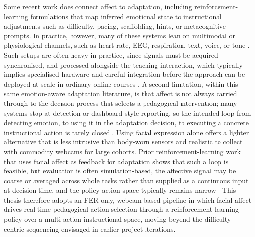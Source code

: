 Some recent work does connect affect to adaptation, including reinforcement-learning formulations that map inferred emotional state to instructional adjustments such as difficulty, pacing, scaffolding, hints, or metacognitive prompts. In practice, however, many of these systems lean on multimodal or physiological channels, such as heart rate, EEG, respiration, text, voice, or tone \cite{gong_design_2025,govea_implementation_2024}. Such setups are often heavy in practice, since signals must be acquired, synchronised, and processed alongside the teaching interaction, which typically implies specialised hardware and careful integration before the approach can be deployed at scale in ordinary online courses \cite{gutierrez_development_2025,kong_real-time_2025,nandimandalam_ai-powered_2025}. A second limitation, within this same emotion-aware adaptation literature, is that affect is not always carried through to the decision process that selects a pedagogical intervention; many systems stop at detection or dashboard-style reporting, so the intended loop from detecting emotion, to using it in the adaptation decision, to executing a concrete instructional action is rarely closed \cite{fernandez-herrero_evaluating_2024,septiana_emotion-related_2024,vistorte_integrating_2024}. Using facial expression alone offers a lighter alternative that is less intrusive than body-worn sensors and realistic to collect with commodity webcams for large cohorts. Prior reinforcement-learning work that uses facial affect as feedback for adaptation shows that such a loop is feasible, but evaluation is often simulation-based, the affective signal may be coarse or averaged across whole tasks rather than supplied as a continuous input at decision time, and the policy action space typically remains narrow \cite{perez_emotions_2024}. This thesis therefore adopts an \ac{FER}-only, webcam-based pipeline in which facial affect drives real-time pedagogical action selection through a reinforcement-learning policy over a multi-action instructional space, moving beyond the difficulty-centric sequencing envisaged in earlier project iterations.

